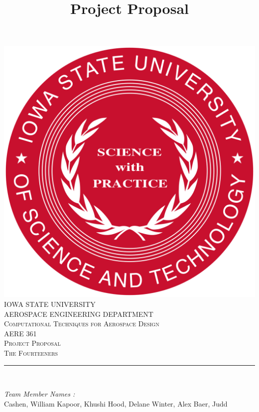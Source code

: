 \documentclass[12pt]{article}
\begin{document}
\title{Project Proposal}

\begin{titlepage}
	\centering
    \vspace*{0.5 cm}
    \includegraphics[scale = 0.11]{isu_seal.png}\\[1.0 cm]	%
    \textsc{\LARGE IOWA STATE UNIVERSITY}\\[2.0 cm]
    \textsc{\large AEROSPACE ENGINEERING DEPARTMENT}\\[0.2 cm]
    \textsc{\large Computational Techniques for Aerospace Design}\\[0.2 cm]
	\textsc{\Large AERE 361}\\[0.5 cm]				%
	\textsc{\Large Project Proposal}\\[0.2 cm]
	\textsc{\Large The Fourteeners}\\[0.2 cm]
	\rule{\linewidth}{0.2 mm} \\[0.4 cm]
	
	
	\begin{minipage}{0.8\textwidth}
		
			\begin{flushleft} 
			\emph{Team Member Names :} \\
			Cashen, William\linebreak
			Kapoor, Khushi\linebreak
			Hood, Delane\linebreak
			Winter, Alex\linebreak
			Baer, Judd\linebreak
			
		\end{flushleft}
	\end{minipage}\\[2 cm]
	
	\vfill
	
\end{titlepage}
\end{document}
